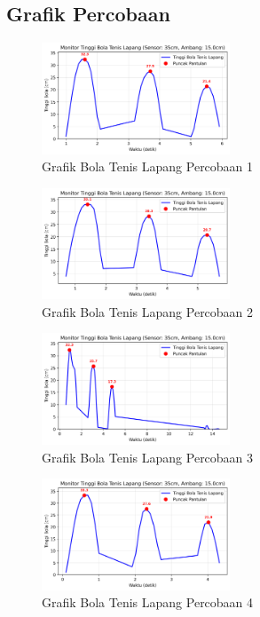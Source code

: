 \subsection{Grafik Percobaan}
\begin{figure}[htbp]
    \centering
    \includegraphics[width=0.5\textwidth]{chapters/DataPercobaan/Grafik_Bola_Tenis_Lapang_1.png}
    \caption{Grafik Bola Tenis Lapang Percobaan 1}
\end{figure}
\begin{figure}[htbp]
    \centering
    \includegraphics[width=0.5\textwidth]{chapters/DataPercobaan/Grafik_Bola_Tenis_Lapang_2.png}
    \caption{Grafik Bola Tenis Lapang Percobaan 2}
\end{figure}
\begin{figure}[htbp]
    \centering
    \includegraphics[width=0.5\textwidth]{chapters/DataPercobaan/Grafik_Bola_Tenis_Lapang_3.png}
    \caption{Grafik Bola Tenis Lapang Percobaan 3}
\end{figure}
\begin{figure}[htbp]
    \centering
    \includegraphics[width=0.5\textwidth]{chapters/DataPercobaan/Grafik_Bola_Tenis_Lapang_4.png}
    \caption{Grafik Bola Tenis Lapang Percobaan 4}
\end{figure}

